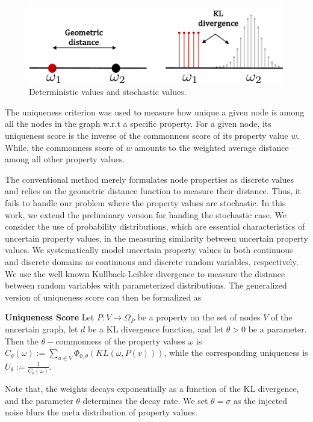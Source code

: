 \begin{figure}
	\centering
        \includegraphics[width=\linewidth]{ill/shift_distance.pdf}
    \caption{Deterministic values and stochastic values.}
\end{figure}
The uniqueness criterion was used to measure how unique a given node is among all the nodes in the graph w.r.t a specific property. 
For a given node, its uniqueness score is the inverse of the commonness score of its property value $w$.
While, the commonness score of $w$ amounts to the weighted average distance among all other property values. 

The conventional method merely formulates node properties as discrete values and relies on the geometric distance function to measure their distance.  
Thus, it fails to handle our problem where the property values are stochastic.   
In this work, we extend the preliminary version for handing the stochastic case. 
We consider the use of probability distributions, which are essential characteristics of uncertain property values, in the measuring similarity between uncertain property values. 
We systematically model uncertain property values in both continuous and discrete domains as continuous and discrete random variables, respectively.
We use the well known Kullback-Leibler divergence to measure the distance between random variables with parameterized distributions. 
The generalized version of uniqueness score can then be formalized as
\begin{definition}
    \textbf{Uniqueness Score}
     Let $P:V \rightarrow  \Omega_{P}$ be a property on the set of nodes $V$ of the uncertain graph, 
     let $d$ be a KL divergence function, and let $\theta >0$  be a parameter. 
  	 Then the $\theta-$commonness of the property values $\omega$
  	 is $C_{\theta}(\omega):= \sum_{u \in V} \Phi_{0,\theta}(KL(\omega, P(v)))$,   
	 while the corresponding uniqueness is $U_{\theta}:= \frac{1}{C_{\theta}(\omega)}$. 
	 \vspace{-2pt}
\end{definition} 
Note that, the weights decays exponentially as a function of the KL divergence, 
and the parameter $\theta$ determines the decay rate. 
We set $\theta=\sigma$ as the injected noise blurs the meta distribution of property values. 
 
